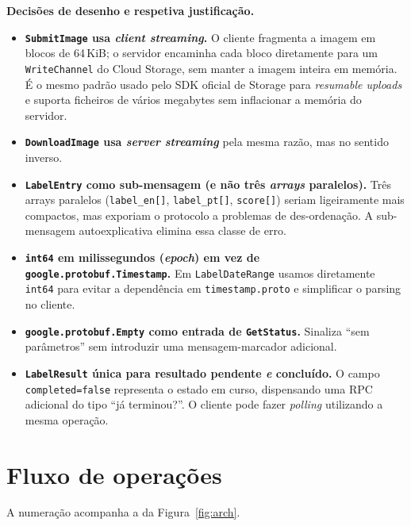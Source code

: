 \documentclass[11pt,a4paper]{article}
\begin{document}
\textbf{Decis\~oes de desenho e respetiva justifica\c{c}\~ao.}
\begin{itemize}[leftmargin=1.4em,itemsep=2pt]
  \item \textbf{\texttt{SubmitImage} usa \emph{client streaming}.} O
        cliente fragmenta a imagem em blocos de 64\,KiB; o servidor
        encaminha cada bloco diretamente para um \texttt{WriteChannel}
        do Cloud Storage, sem manter a imagem inteira em mem\'oria.
        \'E o mesmo padr\~ao usado pelo SDK oficial de Storage para
        \emph{resumable uploads} e suporta ficheiros de v\'arios megabytes
        sem inflacionar a mem\'oria do servidor.
  \item \textbf{\texttt{DownloadImage} usa \emph{server streaming}}
        pela mesma raz\~ao, mas no sentido inverso.
  \item \textbf{\texttt{LabelEntry} como sub-mensagem (e n\~ao tr\^es
        \emph{arrays} paralelos).} Tr\^es arrays paralelos
        (\texttt{label\_en[]}, \texttt{label\_pt[]}, \texttt{score[]})
        seriam ligeiramente mais compactos, mas exporiam o protocolo a
        problemas de des-ordena\c{c}\~ao. A sub-mensagem autoexplicativa
        elimina essa classe de erro.
  \item \textbf{\texttt{int64} em milissegundos (\emph{epoch}) em vez
        de \texttt{google.protobuf.Timestamp}.} Em
        \texttt{LabelDateRange} usamos diretamente \texttt{int64} para
        evitar a depend\^encia em \texttt{timestamp.proto} e simplificar
        o parsing no cliente.
  \item \textbf{\texttt{google.protobuf.Empty} como entrada de
        \texttt{GetStatus}.} Sinaliza ``sem par\^ametros'' sem introduzir
        uma mensagem-marcador adicional.
  \item \textbf{\texttt{LabelResult} \'unica para resultado pendente
        \emph{e} conclu\'ido.} O campo \texttt{completed=false}
        representa o estado em curso, dispensando uma RPC adicional do
        tipo ``j\'a terminou?''. O cliente pode fazer \emph{polling}
        utilizando a mesma opera\c{c}\~ao.
\end{itemize}

\section{Fluxo de opera\c{c}\~oes}
\label{sec:fluxo}

A numera\c{c}\~ao acompanha a da Figura~\ref{fig:arch}.
\end{document}
